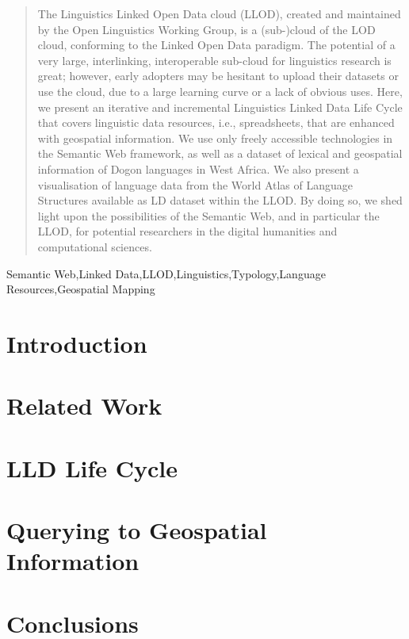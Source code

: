 \documentclass{iosart2c}
\begin{document}
\begin{frontmatter}
\begin{abstract}
The Linguistics Linked Open Data cloud (LLOD), created and maintained by the Open Linguistics Working Group, is a (sub-)cloud of the LOD cloud, conforming to the Linked Open Data paradigm. The potential of a very large, interlinking, interoperable sub-cloud for linguistics research is great; however, early adopters may be hesitant to upload their datasets or use the cloud, due to a large learning curve or a lack of obvious uses. Here, we present an iterative and incremental Linguistics Linked Data Life Cycle that covers linguistic data resources, i.e., spreadsheets, that are enhanced with geospatial information. We use only freely accessible technologies in the Semantic Web framework, as well as a dataset of lexical and geospatial information of Dogon languages in West Africa. We also present a visualisation of language data from the World Atlas of Language Structures available as LD dataset within the LLOD. By doing so, we shed light upon the possibilities of the Semantic Web, and in particular the LLOD, for potential researchers in the digital humanities and computational sciences. %
\end{abstract}

\begin{keyword}
Semantic Web\sep Linked Data\sep LLOD\sep Linguistics\sep Typology\sep Language Resources\sep Geospatial Mapping
\end{keyword}

\end{frontmatter}


\section{Introduction}


\section{Related Work}


\section{LLD Life Cycle}


\section{Querying to Geospatial Information}


\section{Conclusions}




\end{document}
